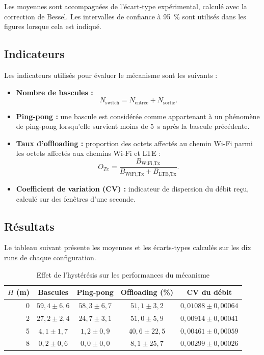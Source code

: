 Les moyennes sont accompagnées de l'écart-type expérimental, calculé
avec la correction de Bessel. Les intervalles de confiance à
\SI{95}{\percent} sont utilisés dans les figures lorsque cela est
indiqué.

\subsection{Indicateurs}

Les indicateurs utilisés pour évaluer le mécanisme sont les suivants :

\begin{itemize}

\item \textbf{Nombre de bascules :}
\[
N_{\text{switch}} =
N_{\text{entrée}} + N_{\text{sortie}}.
\]

\item \textbf{Ping-pong :} une bascule est considérée comme appartenant
à un phénomène de ping-pong lorsqu'elle survient moins de
\SI{5}{s} après la bascule précédente.

\item \textbf{Taux d'offloading :} proportion des octets affectés au
chemin Wi-Fi parmi les octets affectés aux chemins Wi-Fi et LTE :
\[
O_{Tx} =
\frac{B_{\text{WiFi,Tx}}}
{B_{\text{WiFi,Tx}}+B_{\text{LTE,Tx}}}.
\]

\item \textbf{Coefficient de variation (CV) :} indicateur de dispersion
du débit reçu, calculé sur des fenêtres d'une seconde.

\end{itemize}

\subsection{Résultats}

Le tableau suivant présente les moyennes et les écarts-types calculés
sur les dix runs de chaque configuration.

\begin{table}[H]
\centering
\caption{Effet de l'hystérésis sur les performances du mécanisme}
\label{tab:b5_results}
\small
\begin{tabular}{rcccc}
\toprule
$H$ (m) &
Bascules &
Ping-pong &
Offloading (\%) &
CV du débit\\
\midrule
0 &
$59{,}4\pm 6{,}6$ &
$58{,}3\pm 6{,}7$ &
$51{,}1\pm 3{,}2$ &
$0{,}01088\pm 0{,}00064$\\

2 &
$27{,}2\pm 2{,}4$ &
$24{,}7\pm 3{,}1$ &
$51{,}0\pm 5{,}9$ &
$0{,}00914\pm 0{,}00041$\\

5 &
$4{,}1\pm 1{,}7$ &
$1{,}2\pm 0{,}9$ &
$40{,}6\pm 22{,}5$ &
$0{,}00461\pm 0{,}00059$\\

8 &
$0{,}2\pm 0{,}6$ &
$0{,}0\pm 0{,}0$ &
$8{,}1\pm 25{,}7$ &
$0{,}00299\pm 0{,}00026$\\
\bottomrule
\end{tabular}
\end{table}

